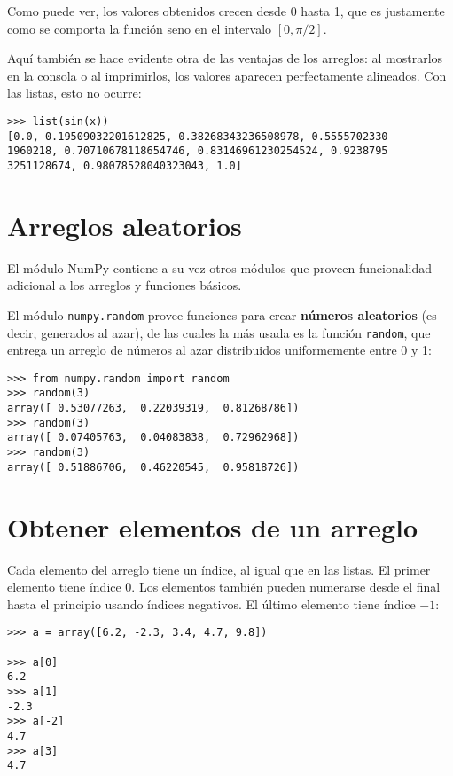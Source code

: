 Como puede ver, los valores obtenidos crecen desde 0 hasta 1, que es
justamente como se comporta la función seno en el intervalo
\(\left[0, \pi/2\right]\).

Aquí también se hace evidente otra de las ventajas de los arreglos: al
mostrarlos en la consola o al imprimirlos, los valores aparecen
perfectamente alineados. Con las listas, esto no ocurre:

\begin{lstlisting}
>>> list(sin(x))
[0.0, 0.19509032201612825, 0.38268343236508978, 0.5555702330
1960218, 0.70710678118654746, 0.83146961230254524, 0.9238795
3251128674, 0.98078528040323043, 1.0]
\end{lstlisting}

\section{Arreglos aleatorios}

El módulo NumPy contiene a su vez otros módulos que proveen
funcionalidad adicional a los arreglos y funciones básicos.

El módulo \lstinline!numpy.random! provee funciones para crear
\textbf{números aleatorios} (es decir, generados al azar), de las cuales
la más usada es la función \lstinline!random!, que entrega un arreglo de
números al azar distribuidos uniformemente entre 0 y 1:

\begin{lstlisting}
>>> from numpy.random import random
>>> random(3)
array([ 0.53077263,  0.22039319,  0.81268786])
>>> random(3)
array([ 0.07405763,  0.04083838,  0.72962968])
>>> random(3)
array([ 0.51886706,  0.46220545,  0.95818726])
\end{lstlisting}

\section{Obtener elementos de un arreglo}

Cada elemento del arreglo tiene un índice, al igual que en las listas.
El primer elemento tiene índice 0. Los elementos también pueden
numerarse desde el final hasta el principio usando índices negativos. El
último elemento tiene índice \(-1\):

\begin{lstlisting}
>>> a = array([6.2, -2.3, 3.4, 4.7, 9.8])

>>> a[0]
6.2
>>> a[1]
-2.3
>>> a[-2]
4.7
>>> a[3]
4.7
\end{lstlisting}

